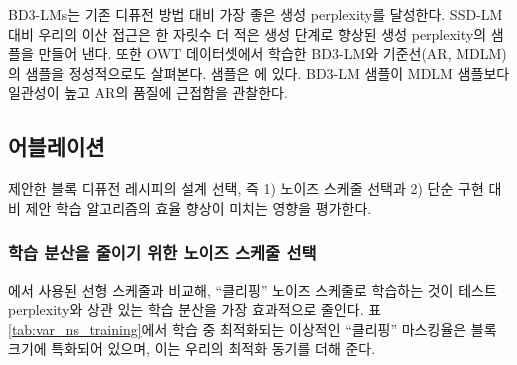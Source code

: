 \documentclass{article} %
\def\algos{BD3-LMs}
\def\algo{BD3-LM}
\begin{document}
\algos{}는 기존 디퓨전 방법 대비 가장 좋은 생성 perplexity를 달성한다. SSD-LM 대비 우리의 이산 접근은 한 자릿수 더 적은 생성 단계로 향상된 생성 perplexity의 샘플을 만들어 낸다. 또한 OWT 데이터셋에서 학습한 \algo{}와 기준선(AR, MDLM)의 샘플을 정성적으로도 살펴본다. 샘플은 에 있다. \algo{} 샘플이 MDLM 샘플보다 일관성이 높고 AR의 품질에 근접함을 관찰한다.


\subsection{어블레이션}\label{sec:ablation}
제안한 블록 디퓨전 레시피의 설계 선택, 즉 1) 노이즈 스케줄 선택과 2) 단순 구현 대비 제안 학습 알고리즘의 효율 향상이 미치는 영향을 평가한다.

\subsubsection*{학습 분산을 줄이기 위한 노이즈 스케줄 선택}


\citet{lou2024discrete, sahoo2024simple}에서 사용된 선형 스케줄과 비교해, ``클리핑'' 노이즈 스케줄로 학습하는 것이 테스트 perplexity와 상관 있는 학습 분산을 가장 효과적으로 줄인다. 표 \ref{tab:var_ns_training}에서 학습 중 최적화되는 이상적인 ``클리핑'' 마스킹율은 블록 크기에 특화되어 있으며, 이는 우리의 최적화 동기를 더해 준다.
\end{document}
